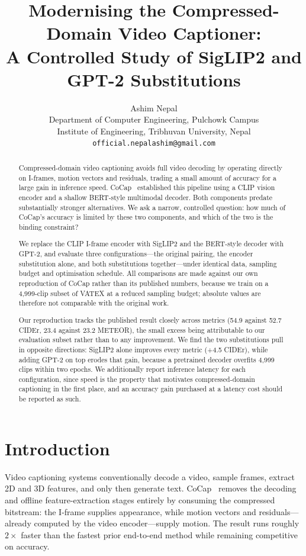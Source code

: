 \documentclass[10pt,twocolumn,letterpaper]{article}
\title{\Large\bf Modernising the Compressed-Domain Video Captioner:\\
A Controlled Study of SigLIP2 and GPT-2 Substitutions}
\author{
Ashim Nepal\\
Department of Computer Engineering, Pulchowk Campus\\
Institute of Engineering, Tribhuvan University, Nepal\\
{\tt\small official.nepalashim@gmail.com}
}
\date{}
\begin{document}
\maketitle

\begin{abstract}
Compressed-domain video captioning avoids full video decoding by operating directly on I-frames,
motion vectors and residuals, trading a small amount of accuracy for a large gain in inference
speed. CoCap~\cite{cocap} established this pipeline using a CLIP vision encoder and a shallow
BERT-style multimodal decoder. Both components predate substantially stronger alternatives. We
ask a narrow, controlled question: how much of CoCap's accuracy is limited by these two
components, and which of the two is the binding constraint?

We replace the CLIP I-frame encoder with SigLIP2 and the BERT-style decoder with GPT-2, and
evaluate three configurations---the original pairing, the encoder substitution alone, and both
substitutions together---under identical data, sampling budget and optimisation schedule. All
comparisons are made against our own reproduction of CoCap rather than its published numbers,
because we train on a 4,999-clip subset of VATEX at a reduced sampling budget; absolute values
are therefore not comparable with the original work.

Our reproduction tracks the published result closely across metrics (54.9 against 52.7
CIDEr, 23.4 against 23.2 METEOR), the small excess being attributable to our evaluation
subset rather than to any improvement.
We find the two substitutions pull in opposite directions: SigLIP2 alone improves every metric
(+4.5 CIDEr), while adding GPT-2 on top erodes that gain, because a pretrained decoder overfits
4,999 clips within two epochs. We additionally report
inference latency for each configuration, since speed is the property that motivates
compressed-domain captioning in the first place, and an accuracy gain purchased at a latency
cost should be reported as such.
\end{abstract}

\section{Introduction}
\label{sec:intro}

Video captioning systems conventionally decode a video, sample frames, extract 2D and 3D
features, and only then generate text. CoCap~\cite{cocap} removes the decoding and offline
feature-extraction stages entirely by consuming the compressed bitstream: the I-frame supplies
appearance, while motion vectors and residuals---already computed by the video encoder---supply
motion. The result runs roughly $2\times$ faster than the fastest prior end-to-end method while
remaining competitive on accuracy.
\end{document}
